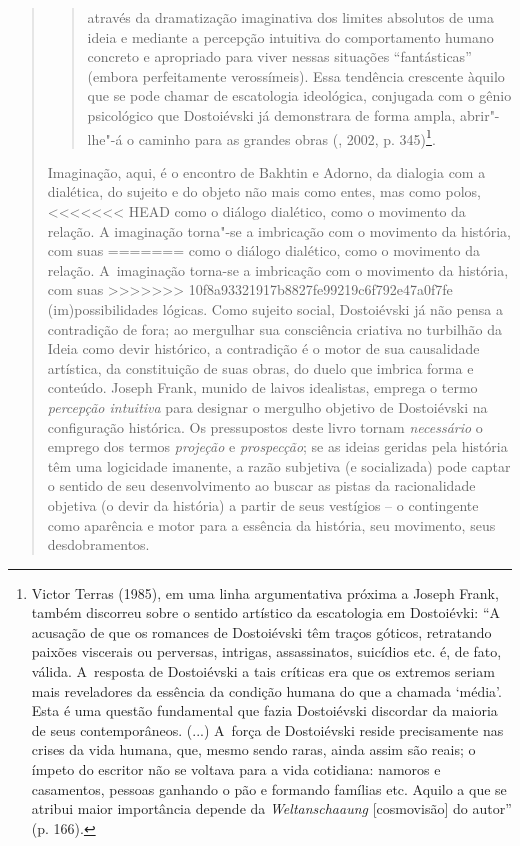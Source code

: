 {\begin{quote}
\begin{quote}
através da dramatização imaginativa dos limites absolutos de uma ideia e
mediante a percepção intuitiva do comportamento humano concreto e
apropriado para viver nessas situações ``fantásticas'' (embora
perfeitamente verossímeis). Essa tendência crescente àquilo que se pode
chamar de escatologia ideológica, conjugada com o gênio psicológico que
Dostoiévski já demonstrara de forma ampla, abrir"-lhe"-á o caminho para as
grandes obras (, 2002, p. 345)\footnote{Victor Terras (1985), em
  uma linha argumentativa próxima a Joseph Frank, também discorreu sobre
  o sentido artístico da escatologia em Dostoiévki: ``A acusação de que
  os romances de Dostoiévski têm traços góticos, retratando paixões
  viscerais ou perversas, intrigas, assassinatos, suicídios etc. é, de
  fato, válida. A~resposta de Dostoiévski a tais críticas era que os
  extremos seriam mais reveladores da essência da condição humana do que
  a chamada `média'. Esta é uma questão fundamental que fazia
  Dostoiévski discordar da maioria de seus contemporâneos. (...) A~força
  de Dostoiévski reside precisamente nas crises da vida humana, que,
  mesmo sendo raras, ainda assim são reais; o ímpeto do escritor não se
  voltava para a vida cotidiana: namoros e casamentos, pessoas ganhando
  o pão e formando famílias etc. Aquilo a que se atribui maior
  importância depende da \emph{Weltanschaaung} {[}cosmovisão{]} do
  autor'' (p. 166).}.
\end{quote}

Imaginação, aqui, é o encontro de Bakhtin e Adorno, da dialogia com a
dialética, do sujeito e do objeto não mais como entes, mas como polos,
<<<<<<< HEAD
como o diálogo dialético, como o movimento da relação. A imaginação
torna"-se a imbricação com o movimento da história, com suas
=======
como o diálogo dialético, como o movimento da relação. A~imaginação
torna-se a imbricação com o movimento da história, com suas
>>>>>>> 10f8a93321917b8827fe99219c6f792e47a0f7fe
(im)possibilidades lógicas. Como sujeito social, Dostoiévski já não
pensa a contradição de fora; ao mergulhar sua consciência criativa no
turbilhão da Ideia como devir histórico, a contradição é o motor de sua
causalidade artística, da constituição de suas obras, do duelo que
imbrica forma e conteúdo. Joseph Frank, munido de laivos idealistas,
emprega o termo \emph{percepção intuitiva} para designar o mergulho
objetivo de Dostoiévski na configuração histórica. Os pressupostos deste
livro tornam \emph{necessário} o emprego dos termos \emph{projeção} e
\emph{prospecção}; se as ideias geridas pela história têm uma logicidade
imanente, a razão subjetiva (e socializada) pode captar o sentido de seu
desenvolvimento ao buscar as pistas da racionalidade objetiva (o devir
da história) a partir de seus vestígios -- o contingente como aparência
e motor para a essência da história, seu movimento, seus desdobramentos.


\end{quote}}
